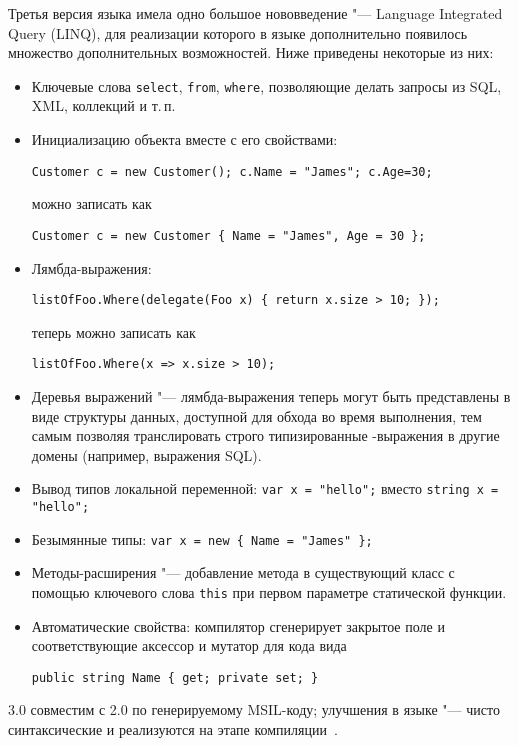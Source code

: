 Третья версия языка имела одно большое нововведение "--- Language Integrated Query (LINQ), для реализации которого в языке дополнительно появилось множество дополнительных возможностей.
Ниже приведены некоторые из них:
\begin{itemize}
  \item Ключевые слова \lstinline[style=csharpinlinestyle]!select!, \lstinline[style=csharpinlinestyle]!from!, \lstinline[style=csharpinlinestyle]!where!, позволяющие делать запросы из SQL, XML, коллекций и т.\,п.

  \item Инициализацию объекта вместе с его свойствами:
  \begin{lstlisting}[style=csharpinlinestyle]
Customer c = new Customer(); c.Name = "James"; c.Age=30;
  \end{lstlisting}
  можно записать как
  \begin{lstlisting}[style=csharpinlinestyle]
Customer c = new Customer { Name = "James", Age = 30 };
  \end{lstlisting}

  \item Лямбда-выражения:
  \begin{lstlisting}[style=csharpinlinestyle]
listOfFoo.Where(delegate(Foo x) { return x.size > 10; });
  \end{lstlisting}
  теперь можно записать как
  \begin{lstlisting}[style=csharpinlinestyle]
listOfFoo.Where(x => x.size > 10);
  \end{lstlisting}

  \item Деревья выражений "--- лямбда-выражения теперь могут быть представлены в виде структуры данных, доступной для обхода во время выполнения, тем самым позволяя транслировать строго типизированные \csharp{}-выражения в другие домены (например, выражения SQL).

  \item Вывод типов локальной переменной: \lstinline[style=csharpinlinestyle]!var x = "hello";! вместо \lstinline[style=csharpinlinestyle]!string x = "hello";!

  \item Безымянные типы: \lstinline[style=csharpinlinestyle]!var x = new { Name = "James" };!

  \item Методы-расширения "--- добавление метода в существующий класс с помощью ключевого слова \lstinline[style=csharpinlinestyle]!this! при первом параметре статической функции.

  \item Автоматические свойства: компилятор сгенерирует закрытое  поле и соответствующие аксессор и мутатор для кода вида
  \begin{lstlisting}[style=csharpinlinestyle]
public string Name { get; private set; }
  \end{lstlisting}

\end{itemize}
\csharp{} 3.0 совместим с \csharp{} 2.0 по генерируемому MSIL-коду; улучшения в языке "--- чисто синтаксические и реализуются на этапе компиляции~\cite{csharp_wiki_2013_ru}.

